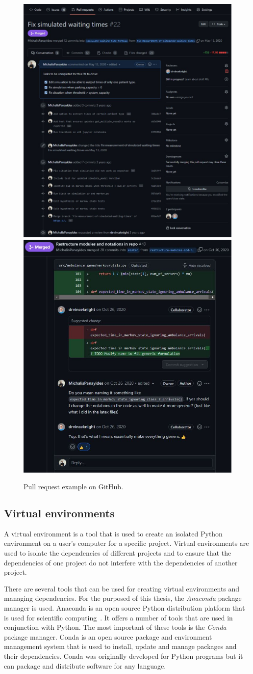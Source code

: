 \begin{figure}[H]
    \includegraphics[width=.495\linewidth]{chapters/01_introduction/Bin/commits.JPG}
    \includegraphics[width=.495\linewidth]{chapters/01_introduction/Bin/conversation.JPG}
    \caption{Pull request example on GitHub.}
    \label{fig:github_pr}
\end{figure}



\subsection{Virtual environments}

A virtual environment is a tool that is used to create an isolated Python
environment on a user's computer for a specific project.
Virtual environments are used to isolate the dependencies of different projects
and to ensure that the dependencies of one project do not interfere with the
dependencies of another project.

There are several tools that can be used for creating virtual environments and
managing dependencies.
For the purposed of this thesis, the \textit{Anaconda} package manager is used.
Anaconda is an open source Python distribution platform that is used for
scientific computing~\cite{rolon2016introduction}.
It offers a number of tools that are used in conjunction with Python.
The most important of these tools is the \textit{Conda} package manager.
Conda is an open source package and environment management system that is used
to install, update and manage packages and their dependencies.
Conda was originally developed for Python programs but it can package and
distribute software for any language.

